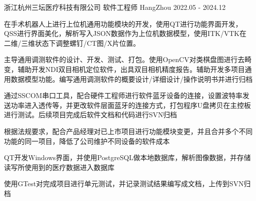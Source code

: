 

\begin{cventries}

  \cventry
    {浙江杭州三坛医疗科技有限公司} %
    {软件工程师} %
    {HangZhou} %
    {2022.05 - 2024.12} %
    {
      \begin{cvitems} %
        \item {在手术机器人上进行上位机通用功能模块的开发，使用QT进行功能界面开发，QSS进行界面美化，解析写入JSON数据作为上位机数据模型，使用ITK/VTK在二维/三维状态下调整螺钉/CT图/X片位置。}
        \item {主导通用调测软件的设计、开发、测试、打包。使用OpenCV对类棋盘图进行去畸变，辅助开发NDI双目相机定位软件，出具双目相机精度报告。辅助开发多项目通用数据模型功能。编写通用调测软件的概要设计/详细设计/操作说明书并进行归档}
        \item {通过SSCOM串口工具，配合硬件工程师进行软件蓝牙设备的连接，设置波特率发送功率进入透传等，并更改软件层面蓝牙的连接方式，打包程序U盘拷贝在主控板进行测试。后续项目完成后软件文档和代码进行SVN归档}
        \item {根据法规要求，配合产品经理对已上市项目进行功能模块变更，并且合并多个不同功能的同一项目，降低了公司维护不同设备的软件成本}
        \item {QT开发Windows界面，并使用PostgreSQL做本地数据库，解析图像数据，并存储读写所使用到的医疗数据进入数据库}
        \item {使用GTest对完成项目进行单元测试，并记录测试结果编写成文档，上传到SVN归档}
      \end{cvitems}
    }

\end{cventries}
